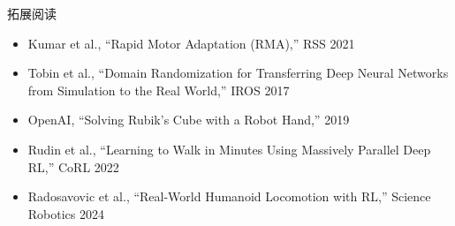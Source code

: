 \documentclass[a4paper]{article}
\begin{document}
\begin{knowledgebox}{拓展阅读}
\begin{itemize}
    \item Kumar et al., ``Rapid Motor Adaptation (RMA),'' RSS 2021
    \item Tobin et al., ``Domain Randomization for Transferring Deep Neural Networks from Simulation to the Real World,'' IROS 2017
    \item OpenAI, ``Solving Rubik's Cube with a Robot Hand,'' 2019
    \item Rudin et al., ``Learning to Walk in Minutes Using Massively Parallel Deep RL,'' CoRL 2022
    \item Radosavovic et al., ``Real-World Humanoid Locomotion with RL,'' Science Robotics 2024
\end{itemize}
\end{knowledgebox}
\end{document}
